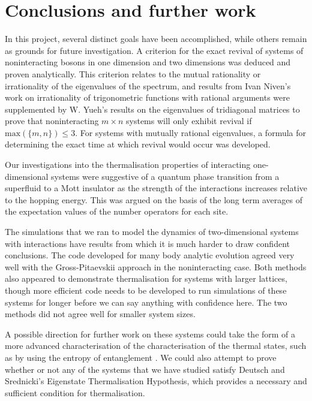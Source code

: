 \documentclass[a4paper, 10pt]{article}
\theoremstyle{plain}
\begin{document}
\section{Conclusions and further work}

In this project, several distinct goals have been accomplished, while others
remain as grounds for future investigation. A criterion for the exact revival
of systems of noninteracting bosons in one dimension and two dimensions was
deduced and proven analytically. This criterion relates to the mutual rationality or
irrationality of the eigenvalues of the spectrum, and results from Ivan Niven's
work on irrationality of trigonometric functions with rational arguments were
supplemented by W. Yueh's results on the eigenvalues of tridiagonal matrices
to prove that noninteracting $m\times n$ systems will only exhibit revival
if $\text{max}(\lbrace m,n \rbrace) \le 3$. For systems with mutually rational
eigenvalues, a formula for determining the exact time at which revival would
occur was developed.

Our investigations into the thermalisation properties of interacting
one-dimensional systems were suggestive of a quantum phase transition from a
superfluid to a Mott insulator as the strength of the interactions increases
relative to the hopping energy. This was argued on the basis of the long term
averages of the expectation values of the number operators for each site.


The simulations that we ran to model the dynamics of two-dimensional systems
with interactions have results from which it is much harder to draw confident
conclusions. The code developed for many body analytic evolution agreed very
well with the Gross-Pitaevskii approach in the noninteracting case. Both methods
also appeared to demonstrate thermalisation for systems with larger lattices,
though more efficient code needs to be developed to run simulations of these
systems for longer before we can say anything with confidence here. The two
methods did not agree well for smaller system sizes.

A possible direction for further work on these systems could take the
form of a more advanced characterisation of the characterisation of the
thermal states, such as by using the entropy of entanglement
. We could also attempt to prove whether or not
any of the systems that we have studied satisfy Deutsch and Srednicki's
Eigenstate Thermalisation Hypothesis, which provides a necessary and
sufficient condition for thermalisation.


\newpage





\end{document}
